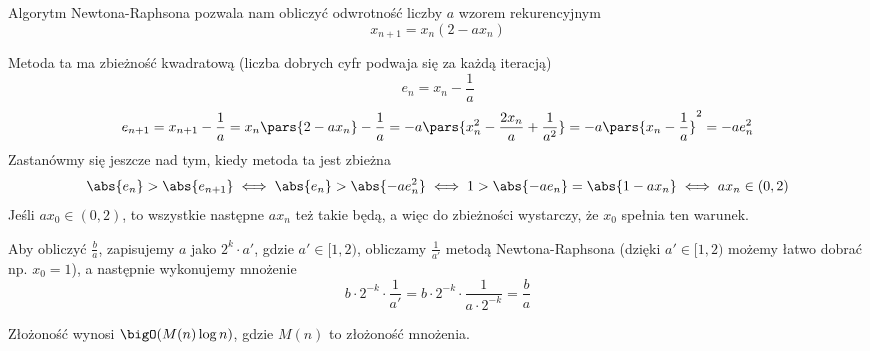 Algorytm Newtona-Raphsona pozwala nam obliczyć odwrotność liczby \(a\) wzorem rekurencyjnym
\[
	x_{n+1} = x_n(2 - a x_n)
\]

Metoda ta ma zbieżność kwadratową (liczba dobrych cyfr podwaja się za każdą iteracją)
\[
	e_n = x_n - \frac{1}{a}
\]
\[
	e_{n+1} = x_{n+1} - \frac{1}{a} = x_n\pars{2 - a x_n} - \frac{1}{a} = -a\pars{x_n^2 - \frac{2 x_n}{a} + \frac{1}{a^2}} = -a\pars{x_n - \frac{1}{a}}^2 = -a e_n^2
\]
Zastanówmy się jeszcze nad tym, kiedy metoda ta jest zbieżna
\[
	\abs{e_n} > \abs{e_{n+1}} \iff \abs{e_n} > \abs{-a e_n^2} \iff 1 > \abs{-a e_n} = \abs{1 - a x_n} \iff a x_n \in (0, 2)
\]
Jeśli \(a x_0 \in (0, 2)\), to wszystkie następne \(a x_n\) też takie będą, a więc do zbieżności wystarczy, że \(x_0\) spełnia ten warunek.

Aby obliczyć \(\frac{b}{a}\), zapisujemy \(a\) jako \(2^k \cdot a'\), gdzie \(a' \in [1, 2)\), obliczamy \(\frac{1}{a'}\) metodą Newtona-Raphsona (dzięki \(a' \in [1, 2)\) możemy łatwo dobrać np. \(x_0 = 1\)), a następnie wykonujemy mnożenie
\[
	b \cdot 2^{-k} \cdot \frac{1}{a'} = b \cdot 2^{-k} \cdot \frac{1}{a \cdot 2^{-k}} = \frac{b}{a}
\]

Złożoność wynosi \(\bigO(M(n) \log n)\), gdzie \(M(n)\) to złożoność mnożenia.

